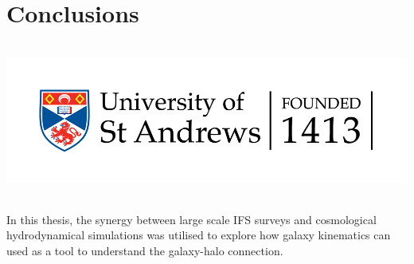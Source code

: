 \chapter{Conclusions}
\vspace{-5in}
\includegraphics[height=2.0in]{thesis/latex/st_a_logo_.png}
\vspace{3in}

In this thesis, the synergy between large scale IFS surveys and cosmological hydrodynamical simulations was utilised to explore how galaxy kinematics can used as a tool to understand the galaxy-halo connection. 